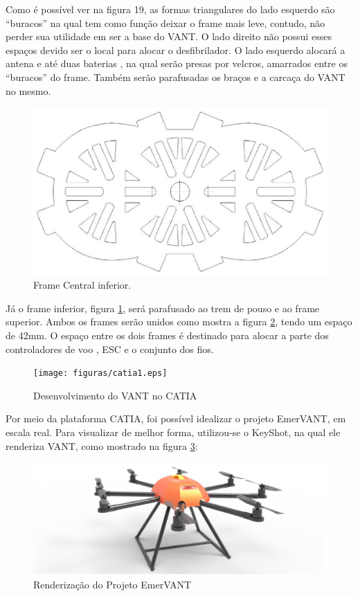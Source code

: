 Como é possível ver na figura 19, as formas triangulares do lado esquerdo são “buracos” na qual tem como função deixar o frame mais leve, contudo, não perder sua utilidade em ser a base do VANT. O lado direito não possui esses espaços devido ser o local para alocar o desfibrilador. O lado esquerdo alocará a antena e até duas baterias , na qual serão presas por velcros, amarrados entre os “buracos” do frame. Também serão parafusadas os braços e a carcaça do VANT no mesmo.

\begin{figure}[H]
    \centering
      \includegraphics[keepaspectratio=true,scale=0.5]{figuras/drawinfinfo.eps}
    \caption{ Frame Central inferior.}
    \label{fig:drawinfinfo}
\end{figure}

Já o frame inferior, figura \ref{fig:drawinfinfo}, será parafusado ao trem de pouso e ao frame superior.  Ambos os frames serão unidos como mostra a figura \ref{fig:catia1}, tendo um espaço de 42mm. O espaço entre os dois frames é destinado para alocar a parte dos controladores de voo , ESC e o conjunto dos fios.

\begin{figure}[H]
    \centering
      \texttt{[image: figuras/catia1.eps]}
    \caption{Desenvolvimento do VANT no CATIA}
    \label{fig:catia1}
\end{figure}

Por meio da plataforma CATIA, foi possível idealizar o projeto EmerVANT, em escala real. Para visualizar de melhor forma, utilizou-se o KeyShot, na qual ele renderiza VANT, como mostrado na figura \ref{fig:keyshot1}:

\begin{figure}[H]
    \centering
      \includegraphics[keepaspectratio=true,scale=0.5]{figuras/keyshot1.eps}
    \caption{ Renderização do Projeto EmerVANT}
    \label{fig:keyshot1}
\end{figure}

